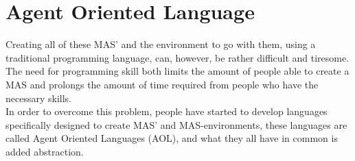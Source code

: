 \section{Agent Oriented Language}
Creating all of these MAS' and the environment to go with them, using a traditional programming language, can, however, be rather difficult and tiresome. The need for programming skill both limits the amount of people able to create a MAS and prolongs the amount of time required from people who have the necessary skills.\\
\indent In order to overcome this problem, people have started to develop languages specifically designed to create MAS' and MAS-environments, these languages are called Agent Oriented Languages (AOL), and what they all have in common is added abstraction. 